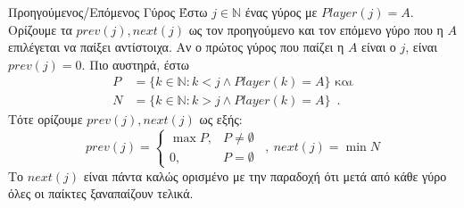 {}
\begin{definitiongr}{Προηγούμενος/Επόμενος Γύρος}
  Έστω $j \in \mathbb{N}$ ένας γύρος με $Player\left(j\right) = A$. Ορίζουμε τα $prev\left(j\right), next\left(j\right)$ ως
  τον προηγούμενο και τον επόμενο γύρο που η $A$ επιλέγεται να παίξει αντίστοιχα. Αν ο πρώτος γύρος που παίζει η $A$ είναι ο
  $j$, είναι $prev\left(j\right) = 0$. Πιο αυστηρά, έστω
  \begin{align*}
    P &= \{k \in \mathbb{N} : k < j \wedge Player\left(k\right) = A\} \mbox{ και} \\
    N &= \{k \in \mathbb{N} : k > j \wedge Player\left(k\right) = A\} \enspace.
  \end{align*}
  Τότε ορίζουμε $prev\left(j\right), next\left(j\right)$ ως εξής:
  \begin{equation*}
    prev\left(j\right) = \begin{cases}
      \max{P}, & P \neq \emptyset \\
      0, & P = \emptyset
    \end{cases} \enspace, \:
    next\left(j\right) = \min{N}
  \end{equation*}
  Το $next\left(j\right)$ είναι πάντα καλώς ορισμένο με την παραδοχή ότι μετά από κάθε γύρο όλες οι παίκτες ξαναπαίζουν
  τελικά.
\end{definitiongr}

